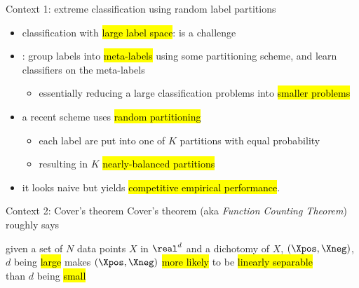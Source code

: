 \begin{frame}{Context 1: extreme classification using random label partitions }
  \begin{itemize}[<+->]
  \item  classification with \hl{large label space}:  is a challenge
  \item {: group labels into \hl{meta-labels} using some partitioning scheme, and learn classifiers on the meta-labels
      \begin{itemize}
      \item essentially reducing a large classification problems into \hl{smaller problems}
      \end{itemize}
    }
  \item {a recent scheme uses \hl{random partitioning}
      \begin{itemize}
      \item each label are put into one of $K$ partitions with equal probability
      \item resulting in $K$ \hl{nearly-balanced partitions}
      \end{itemize}
    }
  \item {it looks naive but yields \hl{competitive empirical performance}. }
  \end{itemize}
\end{frame}

\begin{frame}{Context 2: Cover's theorem }
  Cover's theorem (aka \textit{Function Counting Theorem}) roughly says

  \begin{block}{}
    given a set of $N$ data points $X$ in $\real^{d}$ and a dichotomy of $X$, $(\Xpos, \Xneg)$, \\
    \medskip\pause
    $d$ being \hl{large} makes $(\Xpos, \Xneg)$ \hl{more likely} to be \hl{linearly separable}
    \medskip
    \\than $d$ being \hl{small}
  \end{block}
\end{frame}

